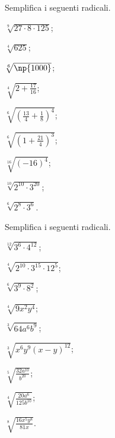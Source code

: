 \begin{esercizio}[\Ast]
 \label{ese:2.28}
Semplifica i seguenti radicali.
 \begin{multicols}{3}
 \begin{enumeratea}
 \item $\sqrt[9]{27\cdot 8\cdot 125}$;
 \item $\sqrt[4]{625}$;
 \item $\sqrt[6]{\np{1000}}$;
 \item $\sqrt[4]{2+\frac{17}{16}}$;
 \item $\sqrt[6]{\left(\frac{13} 4+\frac 1 8\right)^4}$;
 \item $\sqrt[6]{\left(1+\frac{21} 4\right)^3}$;
 \item $\sqrt[16]{(-16)^4}$;
 \item $\sqrt[10]{2^{10}\cdot 3^{20}}$;
 \item $\sqrt[6]{2^8\cdot 3^6}$.
 \end{enumeratea}
 \end{multicols}
\end{esercizio}

\begin{esercizio}[\Ast]
 \label{ese:2.29}
Semplifica i seguenti radicali.
 \begin{multicols}{3}
 \begin{enumeratea}
 \item $\sqrt[12]{3^6\cdot 4^{12}}$;
 \item $\sqrt[4]{2^{10}\cdot 3^{15}\cdot 12^5}$;
 \item $\sqrt[6]{3^9\cdot 8^2}$;
 \item $\sqrt[4]{9x^2y^4}$;
 \item $\sqrt[3]{64a^6b^9}$;
 \item $\sqrt[3]{x^6y^9(x-y)^{12}}$;
 \item $\sqrt[5]{\frac{32a^{10}}{b^{20}}}$;
 \item $\sqrt[4]{\frac{20a^6}{125b^{10}}}$;
 \item $\sqrt[8]{\frac{16x^5y^8}{81x}}$.
 \end{enumeratea}
 \end{multicols}
\end{esercizio}


